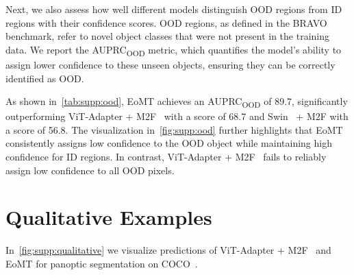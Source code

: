 \documentclass[10pt,twocolumn,letterpaper]{article}
\begin{document}
Next, we also assess how well different models distinguish OOD regions from ID regions with their confidence scores. OOD regions, as defined in the BRAVO~\cite{vu2024bravo} benchmark, refer to novel object classes that were not present in the training data. We report the AUPRC\textsubscript{OOD} metric, which quantifies the model’s ability to assign lower confidence to these unseen objects, ensuring they can be correctly identified as OOD.

As shown in~\cref{tab:supp:ood}, EoMT achieves an AUPRC\textsubscript{OOD} of 89.7, significantly outperforming ViT-Adapter + M2F~\cite{chen2023vitadapter,cheng2022mask2former} with a score of 68.7 and Swin~\cite{liu2021swin} + M2F with a score of 56.8. The visualization in~\cref{fig:supp:ood} further highlights that EoMT consistently assigns low confidence to the OOD object while maintaining high confidence for ID regions. In contrast, ViT-Adapter + M2F~\cite{chen2023vitadapter,cheng2022mask2former} fails to reliably assign low confidence to all OOD pixels.



\section{Qualitative Examples}
\label{sec:supp:qualitative}
In~\cref{fig:supp:qualitative} we visualize predictions of ViT-Adapter + M2F~\cite{chen2023vitadapter,cheng2022mask2former} and EoMT for panoptic segmentation on COCO~\cite{lin2014coco}.
\end{document}
